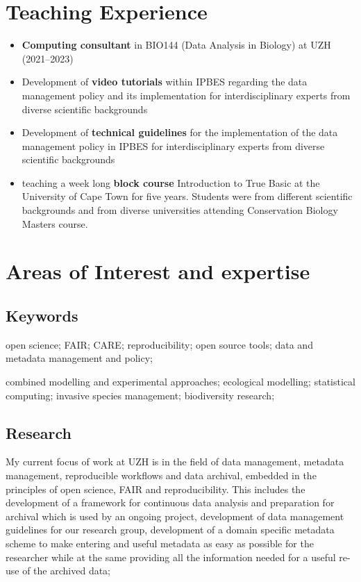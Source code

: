 \documentclass[a4paper]{article}
\begin{document}
\section{Teaching Experience}

\begin{itemize}[leftmargin=1.1in]

\item \textbf{Computing consultant} in BIO144 (Data Analysis in
	Biology) at UZH (2021--2023)

\item Development of \textbf{video tutorials} within IPBES regarding
	the data management policy and its implementation for
	interdisciplinary experts from diverse scientific backgrounds

\item Development of \textbf{technical guidelines} for the
	implementation of the data management policy in IPBES for
	interdisciplinary experts from diverse scientific backgrounds

\item teaching a week long \textbf{block course} Introduction to True
	Basic at the University of Cape Town for five years. Students were
	from different scientific backgrounds and from diverse universities
	attending Conservation Biology Masters course.


\end{itemize}

\section{Areas of Interest and expertise}

\subsection{Keywords}

    open science; FAIR; CARE; reproducibility; 
    open source tools; 
    data and metadata management and policy;
     
    combined modelling and experimental approaches;
    ecological modelling; statistical computing; 
	  invasive species management; biodiversity research;

\subsection{Research}


My current focus of work at UZH is in the field of data management,
	metadata management, reproducible workflows and data archival,
	embedded in the principles of open science, FAIR and reproducibility.
	This includes the development of a framework for continuous data
	analysis and preparation for archival which is used by an ongoing
	project, development of data management guidelines for our research
	group, development of a domain specific metadata scheme to make
	entering and useful metadata as easy as possible for the researcher
	while at the same providing all the information needed for a useful
	re-use of the archived data;
\end{document}
